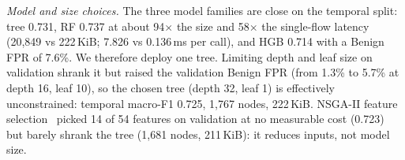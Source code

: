 \emph{Model and size choices.} The three model families are close on the temporal split: tree 0.731, RF 0.737 at about 94$\times$ the size and 58$\times$ the single-flow latency (20,849 vs 222\,KiB; 7.826 vs 0.136\,ms per call), and HGB 0.714 with a Benign FPR of 7.6\%. We therefore deploy one tree. Limiting depth and leaf size on validation shrank it but raised the validation Benign FPR (from 1.3\% to 5.7\% at depth 16, leaf 10), so the chosen tree (depth 32, leaf 1) is effectively unconstrained: temporal macro-F1 0.725, 1,767 nodes, 222\,KiB. NSGA-II feature selection~\cite{deb2002nsga2,blank2020pymoo} picked 14 of 54 features on validation at no measurable cost (0.723) but barely shrank the tree (1,681 nodes, 211\,KiB): it reduces inputs, not model size.
